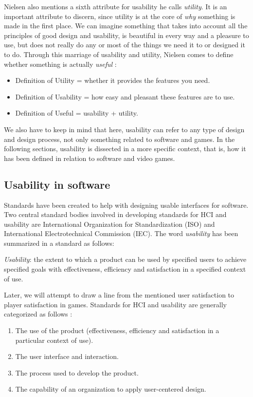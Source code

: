 Nielsen also mentions a sixth attribute for usability he calls \textit{utility}. It is an important attribute to discern, since utility is at the core of \textit{why} something is made in the first place. We can imagine something that takes into account all the principles of good design and usability, is beautiful in every way and a pleasure to use, but does not really do any or most of the things we need it to or designed it to do. Through this marriage of usability and utility, Nielsen comes to define whether something is actually \textit{useful} \cite{Nielsen2012}: 

\begin{itemize}

	\item Definition of Utility = whether it provides the features you need.
	\item Definition of Usability = how easy and pleasant these features are to use.
	\item Definition of Useful = usability + utility.

\end{itemize}

We also have to keep in mind that here, usability can refer to any type of design and design process, not only something related to software and games. In the following sections, usability is dissected in a more specific context, that is, how it has been defined in relation to software and video games.

\subsection{Usability in software}
Standards have been created to help with designing usable interfaces for software. Two central standard bodies involved in developing standards for HCI and usability are International Organization for Standardization (ISO) and International Electrotechnical Commission (IEC). The word \textit{usability} has been summarized in a standard as follows:

\begin{displayquote}

\textit{Usability}: the extent to which a product can be used by specified users to achieve specified goals with effectiveness, efficiency and satisfaction in a specified context of use. \cite{ISO1998}

\end{displayquote}

Later, we will attempt to draw a line from the mentioned user satisfaction to player satisfaction in games. Standards for HCI and usability are generally categorized as follows \cite{Bevan2006}:
\begin{enumerate}
	\item The use of the product (effectiveness, efficiency and satisfaction in a particular context of use).
	\item The user interface and interaction.
	\item The process used to develop the product.
	\item The capability of an organization to apply user-centered design.
\end{enumerate}

